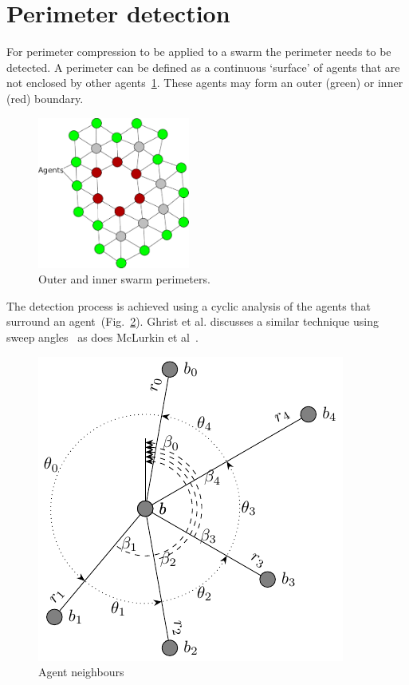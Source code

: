 \documentclass[12pt,a4paper]{IEEEtran}
\begin{document}
\section{Perimeter detection}\label{perimeterDetection}
For perimeter compression to be applied to a swarm the perimeter needs to be detected. A perimeter can be defined as a continuous `surface' of agents that are not enclosed by other agents~\ref{fig:innerOuterPerimeters}. These agents may form an outer ({\color{green}green}) or inner ({\color{red}red}) boundary.

\begin{figure}[H]
	\begin{center}
		\includegraphics[width=5cm]{figures/PerimeterBots1}
	\end{center}
	\caption{{\color{green}Outer} and {\color{red}inner} swarm perimeters. \label{fig:innerOuterPerimeters}}
\end{figure}

The detection process is achieved using a cyclic analysis of the agents that surround an agent~(Fig.~\ref{fig:neighbours}). Ghrist et al. discusses a similar technique using sweep angles~\cite{ghrist2008surrounding} as does McLurkin et al~\cite{mclurkin2009}. 

\begin{figure}[H]
	\centering
	\includegraphics[width=0.8\linewidth]{figures/neighbours}
	\caption[Agent neighbours]{Agent neighbours}
	\label{fig:neighbours}
\end{figure}
\end{document}
